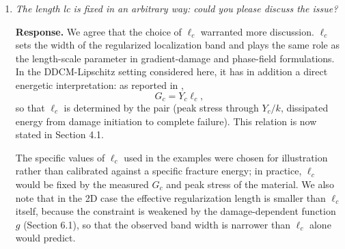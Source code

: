 \documentclass[10pt]{article}
\begin{document}
\begin{enumerate}
\color{blue}
\textbf{Response.} We agree that the deactivation of the constraint at $d = 1$ is an artificial numerical device rather than a physical statement, and this is now stated plainly in Section 4.2. The deactivation is tractable in 1D because failure is contained in a single element and the discontinuity it introduces does not propagate; in 2D it causes convergence difficulties, and it has been replaced in Section 5 by a principled alternative: a damage-dependent weakening of the constraint combined with a log-barrier formulation. The 2D results reported in Sections 5 and 6 therefore rely on this smooth alternative, not on the hard deactivation.

Regarding why the L-beam simulation cannot be driven to complete failure: the L-beam develops a compressive region on the right side of the beam under the applied loading. The present formulation does not include a tension-compression split of the strain energy (see \cite{amor2009regularized, miehe2010phase}), so under purely compressive stress the model allows the damage variable to grow, which is unphysical. The simulation is therefore terminated at the load step where damage in the compressive zone begins to increase. This is now stated explicitly in Section~6.2. By contrast, the notched bar of Section 6.1 is a pure tension problem; no compressive region develops there, and the simulation can therefore be driven all the way to failure. The implementation of a tension-compression split in the data-driven setting is identified as an open problem in the Discussion.

\color{black}
\item \textit{The length lc is fixed in an arbitrary way: could you please discuss the issue?}

\color{blue}
\textbf{Response.} We agree that the choice of $\ell_c$ warranted more discussion. $\ell_c$ sets the width of the regularized localization band and plays the same role as the length-scale parameter in gradient-damage and phase-field formulations. In the DDCM-Lipschitz setting considered here, it has in addition a direct energetic interpretation: as reported in \cite[eq.~55]{Kamasamudram2023},
\begin{equation*}
	G_c = Y_c \ell_c,
\end{equation*}
so that $\ell_c$ is determined by the pair (peak stress through $Y_c/k$, dissipated energy from damage initiation to complete failure). This relation is now stated in Section 4.1.

The specific values of $\ell_c$ used in the examples were chosen for illustration rather than calibrated against a specific fracture energy; in practice, $\ell_c$ would be fixed by the measured $G_c$ and peak stress of the material. We also note that in the 2D case the effective regularization length is smaller than $\ell_c$ itself, because the constraint is weakened by the damage-dependent function $g$ (Section 6.1), so that the observed band width is narrower than $\ell_c$ alone would predict.


\end{enumerate}
\end{document}
